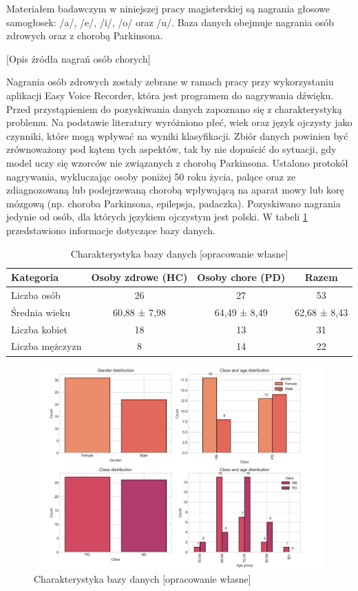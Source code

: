 Materiałem badawczym w niniejszej pracy magisterskiej są nagrania głosowe samogłosek: /a/,
/e/, /i/, /o/ oraz /u/.
Baza danych obejmuje nagrania osób zdrowych oraz z chorobą  Parkinsona.

[Opis źródła nagrań osób chorych]

Nagrania osób zdrowych zostały zebrane w ramach pracy przy wykorzystaniu aplikacji Easy
Voice Recorder, która jest programem do nagrywania dźwięku. Przed przystąpieniem do pozyskiwania
danych zapoznano się z charakterystyką problemu. Na podstawie literatury wyróżniono płeć, wiek oraz
język ojczysty jako czynniki, które mogą wpływać na wyniki klasyfikacji. Zbiór danych powinien być
zrównoważony pod kątem tych aspektów, tak by nie dopuścić do sytuacji, gdy model uczy się wzorców
nie związanych z chorobą Parkinsona.
Ustalono protokół nagrywania, wykluczając osoby poniżej 50 roku życia, palące oraz ze
zdiagnozowaną lub podejrzewaną chorobą wpływającą na aparat mowy lub korę mózgową (np.
choroba Parkinsona, epilepsja, padaczka).
Pozyskiwano nagrania jedynie od osób, dla których językiem ojczystym jest polski.
W tabeli \ref{tab:charakterystyka-bazy-danych} przedstawiono informacje dotyczące bazy danych.

\begin{table}[t]
\centering
\caption{Charakterystyka bazy danych [opracowanie własne]}
\label{tab:charakterystyka-bazy-danych}
\begin{tabular}{|l|c|c|c|}
\hline
\textbf{Kategoria} &\textbf{Osoby zdrowe (HC)} &\textbf{Osoby chore (PD)} &\textbf{Razem} \\ \hline
Liczba osób &26 &27 &53\\ \hline
Średnia wieku &60,88 ± 7,98 &64,49 ± 8,49  &62,68 ± 8,43\\ \hline
Liczba kobiet &18 &13 &31\\ \hline
Liczba mężczyzn &8 &14 &22 \\ \hline
\end{tabular}
\end{table}

\begin{figure}[htbp]
	\centering
	\includegraphics[width=1\textwidth]{./img/database}
	\caption{Charakterystyka bazy danych [opracowanie własne]}
    \label{fig:database}
\end{figure}


